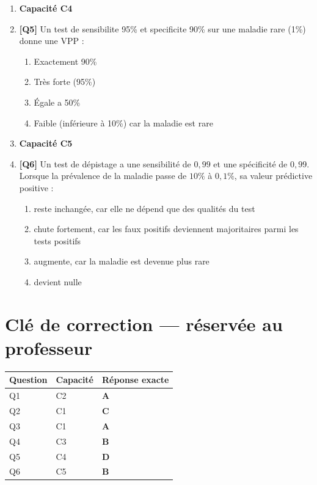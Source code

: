 \begin{enumerate}
\item[] \textbf{Capacité C4}

\item \textbf{[Q5]} Un test de sensibilite 95\% et specificite 90\% sur une maladie rare (1\%) donne une VPP :
  \begin{enumerate}[label=\Alph*.]
    \item Exactement 90\%
    \item Très forte (95\%)
    \item Égale a 50\%
    \item Faible (inférieure à 10\%) car la maladie est rare
  \end{enumerate}

\item[] \textbf{Capacité C5}

\item \textbf{[Q6]} Un test de dépistage a une sensibilité de $0{,}99$ et une spécificité de $0{,}99$. Lorsque la prévalence de la maladie passe de $10\%$ à $0{,}1\%$, sa valeur prédictive positive :
  \begin{enumerate}[label=\Alph*.]
    \item reste inchangée, car elle ne dépend que des qualités du test
    \item chute fortement, car les faux positifs deviennent majoritaires parmi les tests positifs
    \item augmente, car la maladie est devenue plus rare
    \item devient nulle
  \end{enumerate}

\end{enumerate}

\ifnxVersionProfesseur
\clearpage
\section*{Clé de correction — réservée au professeur}

\begin{center}
\begin{tabular}{lll}
\hline
Question & Capacité & Réponse exacte \\
\hline
Q1 & C2 & \textbf{A} \\
Q2 & C1 & \textbf{C} \\
Q3 & C1 & \textbf{A} \\
Q4 & C3 & \textbf{B} \\
Q5 & C4 & \textbf{D} \\
Q6 & C5 & \textbf{B} \\
\hline
\end{tabular}
\end{center}

